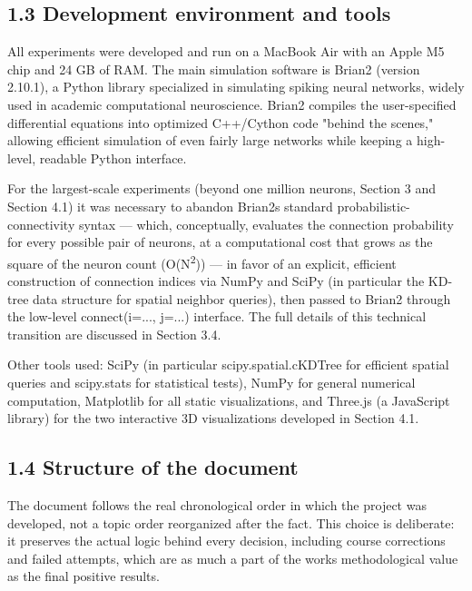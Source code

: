 \documentclass[
  english,
]{article}
\begin{document}
\subsection{1.3 Development environment and tools}\label{development-environment-and-tools}

All experiments were developed and run on a MacBook Air with an Apple M5 chip and 24 GB of RAM. The main simulation software is Brian2 (version 2.10.1), a Python library specialized in simulating spiking neural networks, widely used in academic computational neuroscience. Brian2 compiles the user-specified differential equations into optimized C++/Cython code "behind the scenes," allowing efficient simulation of even fairly large networks while keeping a high-level, readable Python interface.

For the largest-scale experiments (beyond one million neurons, Section 3 and Section 4.1) it was necessary to abandon Brian2\textquotesingle s standard probabilistic-connectivity syntax --- which, conceptually, evaluates the connection probability for every possible pair of neurons, at a computational cost that grows as the square of the neuron count (O(N\textsuperscript{2})) --- in favor of an explicit, efficient construction of connection indices via NumPy and SciPy (in particular the KD-tree data structure for spatial neighbor queries), then passed to Brian2 through the low-level connect(i=..., j=...) interface. The full details of this technical transition are discussed in Section 3.4.

Other tools used: SciPy (in particular scipy.spatial.cKDTree for efficient spatial queries and scipy.stats for statistical tests), NumPy for general numerical computation, Matplotlib for all static visualizations, and Three.js (a JavaScript library) for the two interactive 3D visualizations developed in Section 4.1.

\subsection{1.4 Structure of the document}\label{structure-of-the-document}

The document follows the real chronological order in which the project was developed, not a topic order reorganized after the fact. This choice is deliberate: it preserves the actual logic behind every decision, including course corrections and failed attempts, which are as much a part of the work\textquotesingle s methodological value as the final positive results.
\end{document}
